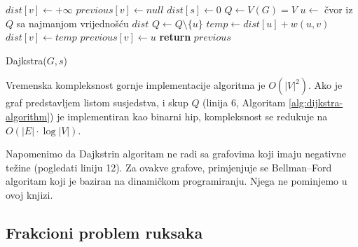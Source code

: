 \documentclass[a4paper, utf8, 11pt, colorlinks]{book}
\begin{document}
\begin{algorithm}[!ht]
	\begin{algorithmic}[1]
	      	\STATE   $dist[v] \gets +\infty$ 	%
		    \STATE $previous[v] \gets null$ 	%
		\ENDFOR
		\STATE	$dist[s] \gets 0$ 	 
		\STATE	$Q \gets V(G)=V$
		\STATE $u \gets$ čvor iz $Q$ sa najmanjom vrijednošću $dist$
		\STATE $Q \gets Q \setminus \{u\}$
		\STATE $temp \gets dist[u] + w(u, v)$
		\STATE  $dist[v] \gets temp$
		\STATE $previous[v] \gets u$ 
		\ENDIF
		\ENDFOR
		\ENDWHILE
		\STATE	\textbf{return} $previous$ 
	\end{algorithmic}
    		\caption{Dajkstra($G,s $)}\label{alg:dijkstra-algorithm}
\end{algorithm}

Vremenska kompleksnost gornje implementacije algoritma je $O(|V|^2)$. Ako je graf predstavljem listom susjedstva, i skup $Q$ (linija 6, Algoritam \ref{alg:dijkstra-algorithm}) je implementiran kao binarni hip, 
kompleksnost se redukuje na $O(|E| \cdot \log |V|)$.

Napomenimo da Dajkstrin algoritam ne radi sa grafovima koji imaju negativne težine (pogledati  liniju 12).  Za ovakve grafove,  primjenjuje se Bellman–Ford algoritam koji je baziran na dinamičkom programiranju. Njega ne pominjemo   u ovoj knjizi.  %

\subsection{Frakcioni problem ruksaka}
\end{document}
